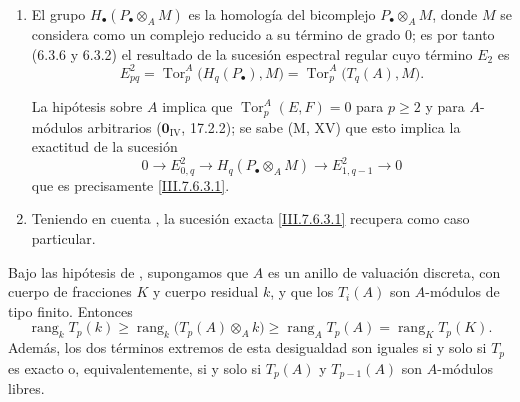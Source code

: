 \begin{remarks}[7.6.4]
\label{III.7.6.4}
\begin{enumerate}
\item[(i)]
El grupo $H_\bullet(P_\bullet\otimes_A M)$ es la homología del
bicomplejo $P_\bullet\otimes_A M$, donde $M$ se considera como un complejo reducido a su
    término de grado 0; es por tanto (6.3.6 y 6.3.2) el resultado de la
    sucesión espectral regular cuyo término $E_2$ es
\[
      E^2_{pq}
      =
      \operatorname{Tor}_p^A\bigl(H_q(P_\bullet),M\bigr)
      =
      \operatorname{Tor}_p^A\bigl(T_q(A),M\bigr).
    \]

La hipótesis sobre $A$ implica que $\operatorname{Tor}_p^A(E,F)=0$ para $p\geq2$
y para $A$-módulos
    arbitrarios ($\mathbf{0}_{\mathrm{IV}}$, 17.2.2); se sabe (M, XV) que esto implica
    la exactitud de la sucesión
    \[
      0\longrightarrow E^2_{0,q}
      \longrightarrow H_q(P_\bullet\otimes_A M)
      \longrightarrow E^2_{1,q-1}
      \longrightarrow0
    \]
que es precisamente \eqref{III.7.6.3.1}.

\medskip
\item[(ii)]
Teniendo en cuenta , la sucesión exacta
\eqref{III.7.6.3.1} recupera  como caso particular.
\end{enumerate}
\end{remarks}

\begin{corollary}[7.6.5]
\label{III.7.6.5}
Bajo las hipótesis de , supongamos que $A$ es un
anillo de valuación discreta, con cuerpo de fracciones $K$ y cuerpo
residual $k$, y que los $T_i(A)$ son $A$-módulos de tipo finito.
Entonces
\[
  \operatorname{rang}_k T_p(k)
  \geq
  \operatorname{rang}_k\bigl(T_p(A)\otimes_A k\bigr)
  \geq
  \operatorname{rang}_A T_p(A)
  =
  \operatorname{rang}_K T_p(K).
  \tag{7.6.5.1}\label{III.7.6.5.1.fr}
\]
Además, los dos términos extremos de esta desigualdad son iguales si
y solo si $T_p$ es exacto o, equivalentemente, si y solo si $T_p(A)$
y $T_{p-1}(A)$ son $A$-módulos libres.
\end{corollary}

